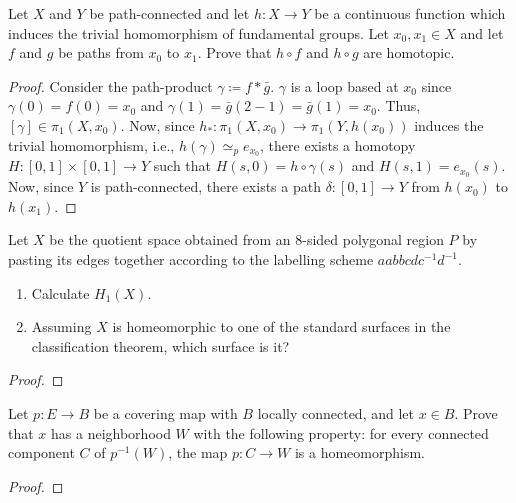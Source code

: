 \begin{problem}
Let $X$ and $Y$ be path-connected and let $h\colon X\to Y$ be a continuous
function which induces the trivial homomorphism of fundamental groups. Let
$x_0,x_1\in X$ and let $f$ and $g$ be paths from $x_0$ to $x_1$. Prove that
$h\circ f$ and $h\circ g$ are homotopic.
\end{problem}
\begin{proof}
Consider the path-product $\gamma\coloneqq f*\bar g$. $\gamma$ is a loop
based at $x_0$ since $\gamma(0)=f(0)=x_0$ and $\gamma(1)=\bar g(2-1)=\bar
g(1)=x_0$. Thus, $[\gamma]\in\pi_1(X,x_0)$. Now, since
$h_*\colon\pi_1(X,x_0)\to\pi_1(Y,h(x_0))$ induces the trivial homomorphism,
i.e., $h(\gamma)\simeq_p e_{x_0}$, there exists a homotopy $H\colon
[0,1]\times[0,1]\to Y$ such that $H(s,0)=h\circ\gamma(s)$ and
$H(s,1)=e_{x_0}(s)$. Now, since $Y$ is path-connected, there exists a path
$\delta\colon[0,1]\to Y$ from $h(x_0)$ to $h(x_1)$.
\end{proof}
\begin{problem}
Let $X$ be the quotient space obtained from an $8$-sided polygonal region
$P$ by pasting its edges together according to the labelling scheme
$aabbcdc^{-1}d^{-1}$.
\begin{enumerate}[noitemsep,label=(\roman*)]
\item Calculate $H_1(X)$.
\item Assuming $X$ is homeomorphic to one of the standard surfaces in the
  classification theorem, which surface is it?
\end{enumerate}
\end{problem}
\begin{proof}
\end{proof}
\begin{problem}
Let $p\colon E\to B$ be a covering map with $B$ locally connected, and let
$x\in B$. Prove that $x$ has a neighborhood $W$ with the following
property: for every connected component $C$ of $p^{-1}(W)$, the map
$p\colon C\to W$ is a homeomorphism.
\end{problem}
\begin{proof}
\end{proof}

